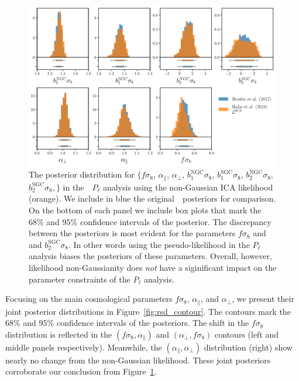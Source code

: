 \documentclass[12pt, letterpaper, preprint]{aastex}
\newcommand{\Beut}{\citetalias{beutler2017}}
\begin{document}
\begin{figure}
\begin{center}
\includegraphics[width=\textwidth]{figs/Like_Pk_comparison.pdf}
\caption{The posterior distribution for 
    $\big \{f \sigma_8$, $\alpha_\parallel$, $\alpha_\perp$, 
    $b_1^\mathrm{NGC} \sigma_8$, $b_1^\mathrm{SGC} \sigma_8$, 
    $b_2^\mathrm{NGC} \sigma_8$, $b_2^\mathrm{SGC} \sigma_8,\big \}$ 
    in the~\Beut~$P_\ell$ analysis using the non-Gaussian ICA 
    likelihood (orange). We include in blue the original~\Beut~posteriors 
    for comparison. On the bottom of each panel we include box 
    plots that mark the $68\%$ and $95\%$ confidence intervals of
    the posterior. The discrepancy between the posteriors is most 
    evident for the parameters $f\sigma_8$ and and $b^\mathrm{SGC}_2 \sigma_8$.  
    In other words using the pseudo-likelihood in the $P_\ell$ 
    analysis biases the posteriors of these parameters. 
    Overall, however, likelihood non-Gaussianity does \emph{not} 
    have a siginificant impact on the parameter constraints of 
    the $P_\ell$ analysis.} 
\label{fig:pk_like}
\end{center}
\end{figure}

Focusing on the main cosmological parameters $f \sigma_8$, 
$\alpha_\parallel$, and $\alpha_\perp$, we present their 
joint posterior distributions in Figure~\ref{fig:rsd_contour}.  
The contours mark the $68\%$ and $95\%$ confidence intervals
of the posteriors. The shift in the $f \sigma_8$ distribution 
is reflected in the
$(f\sigma_8, \alpha_\parallel)$ and $(\alpha_\perp, f\sigma_8)$ 
contours (left and middle panels respectively). Meanwhile, the
$(\alpha_\parallel, \alpha_\perp)$ distribution (right) show nearly 
no change from the non-Gaussian likelihood. These joint posteriors 
corroborate our conclusion from Figure~\ref{fig:pk_like}.
\end{document}
